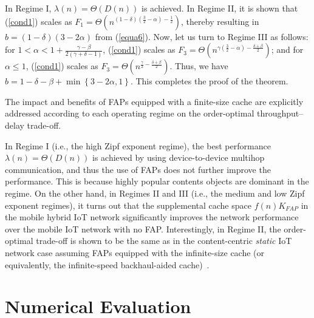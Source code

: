 \documentclass[10pt,journal,compsoc,onecolumn]{IEEEtran}
\begin{document}
\begin{IEEEproof}
In Regime I, $\lambda(n)=\Theta\left(D(n)\right)$ is achieved. In
Regime II, it is shown that (\ref{cond1}) scales as
$F_1=\Theta\left(n^{(1-\delta)(\frac{3}{2}-\alpha)-\frac{1}{2}}\right)$,
thereby resulting in $b=(1-\delta)(3-2\alpha)$ from (\ref{equa6}).
Now, let us turn to Regime III as follows: for
$1<\alpha<1+\frac{\gamma-\beta}{2(\gamma+\delta-1)}$,
(\ref{cond1}) scales as
$F_3=\Theta\left(n^{\gamma(\frac{3}{2}-\alpha)-\frac{\delta+\beta}{2}}\right)$;
and for $\alpha\leq 1$, (\ref{cond1}) scales as
$F_3=\Theta\left(n^{\frac{\gamma}{2}-\frac{\delta+\beta}{2}}\right)$.
Thus, we have $b=1-\delta-\beta+\min
\left\lbrace3-2\alpha,1\right\rbrace$. This completes the proof of
the theorem.
\end{IEEEproof}
The impact and benefits of FAPs equipped with a finite-size cache
are explicitly addressed according to each operating regime on the
order-optimal throughput--delay trade-off.

\begin{remark}
In Regime I (i.e., the high Zipf exponent regime), the best
performance $\lambda(n)=\Theta\left(D(n)\right)$ is achieved by
using device-to-device multihop communication, and thus the use of
FAPs does not further improve the performance.
This is because highly popular contents objects
are dominant in the regime. On the other hand, in Regimes II and
III (i.e., the medium and low Zipf exponent regimes), it turns out
that the supplemental cache space $f(n)K_{FAP}$ in the mobile hybrid IoT network significantly improves
the network performance over the mobile IoT network with no FAP. Interestingly, in Regime II, the order-optimal trade-off is
shown to be the same as in the content-centric \textit{static} IoT network case assuming FAPs
equipped with the infinite-size cache (or equivalently, the
infinite-speed backhaul-aided cache)~\cite{a1}.
\end{remark}

\section{Numerical Evaluation}
\begin{table}[t!]
\centering \caption{The simulation enviroment}\label{table1}
\end{table}
\end{document}
